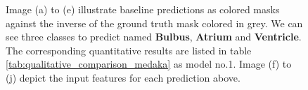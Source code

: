 \begin{figure}[H]
  \caption[Quantitative baseline analysis for the \ac{MFD}]{Image (a) to (e) illustrate baseline predictions as colored masks against the inverse of the ground truth mask colored in grey. We can see three classes to predict named \textbf{\textcolor{rwuvioletlight}{Bulbus}}, \textbf{\textcolor{rwucyan40}{Atrium}} and \textbf{\textcolor{rwucyan}{Ventricle}}. The corresponding quantitative results are listed in table \ref{tab:qualitative_comparison_medaka} as model no.1. Image (f) to (j) depict the input features for each prediction above.}
  \label{ce_medaka_base}
\end{figure}
